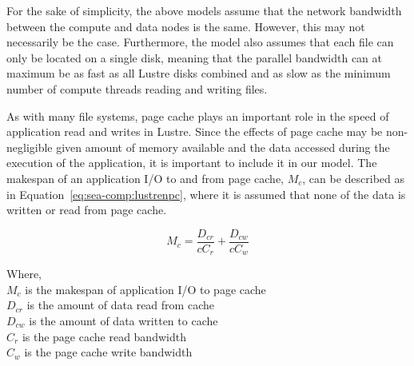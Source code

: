 \documentclass[10pt,journal,compsoc]{IEEEtran}
\begin{document}
      For the sake of simplicity, the above models assume that the network
      bandwidth between the compute and data nodes is the same. However, this
      may not necessarily be the case. Furthermore, the model also assumes that
      each file can only be located on a single disk, meaning that the parallel
      bandwidth can at maximum be as fast as all Lustre disks combined and as
      slow as the minimum number of compute threads reading and writing files.

      As with many file systems, page cache plays an important role in the speed
      of application read and writes in Lustre. Since the effects of page cache
      may be non-negligible given amount of memory available and the data
      accessed during the execution of the application, it is important to
      include it in our model. The makespan of an application I/O to and from
      page cache, $M_{c}$, can be described as in
      Equation~\ref{eq:sea-comp:lustrenpc}, where it is assumed that none of the
      data is written or read from page cache.


      \begin{equation}\label{eq:sea-comp:cache}
          M_{c} = \frac{D_{cr}}{cC_{r}} + \frac{D_{cw}}{cC_{w}}
      \end{equation}

      {\noindent} Where, \\
      $M_{c}$ is the makespan of application I/O to page cache \\
      $D_{cr}$ is the amount of data read from cache \\
      $D_{cw}$ is the amount of data written to cache \\
      $C_{r}$ is the page cache read bandwidth \\
      $C_{w}$ is the page cache write bandwidth \\ 


    

\end{document}
